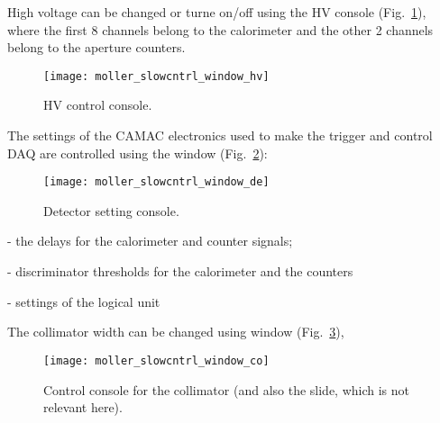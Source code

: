 {{  High voltage can be changed or turne on/off using the HV console (Fig.~\ref{fig:moller_slowc_hv}),
  where the first 8 channels belong to the calorimeter and the other 2 channels
  belong to the aperture counters.
   \begin{figure}[htb]
      \begin{center}
          \texttt{[image: moller\_slowcntrl\_window\_hv]}
      \end{center}
      \caption{HV control console.
            }
      \label{fig:moller_slowc_hv} 
   \end{figure}  
  The settings of the CAMAC electronics used to make the trigger
  and control DAQ are controlled using the  window (Fig.~\ref{fig:moller_slowc_de}):
   \begin{figure}[htb]
      \begin{center}
          \texttt{[image: moller\_slowcntrl\_window\_de]}
      \end{center}
      \caption{Detector setting console.
            }
      \label{fig:moller_slowc_de} 
   \end{figure}  
   \begin{list}{--}{\setlength{\itemsep}{-0.15cm}}
     \item {} - the delays for the calorimeter and counter signals;
     \item {} - discriminator thresholds for the calorimeter and the counters
     \item {} - settings of the logical unit
   \end{list}
  The collimator width can be changed using
   window (Fig.~\ref{fig:moller_slowc_co}),
   \begin{figure}[htb]
      \begin{center}
          \texttt{[image: moller\_slowcntrl\_window\_co]}
      \end{center}
      \caption{Control console for the collimator (and also the slide, which is not relevant
               here).
            }
      \label{fig:moller_slowc_co} 
   \end{figure}  
}

}

